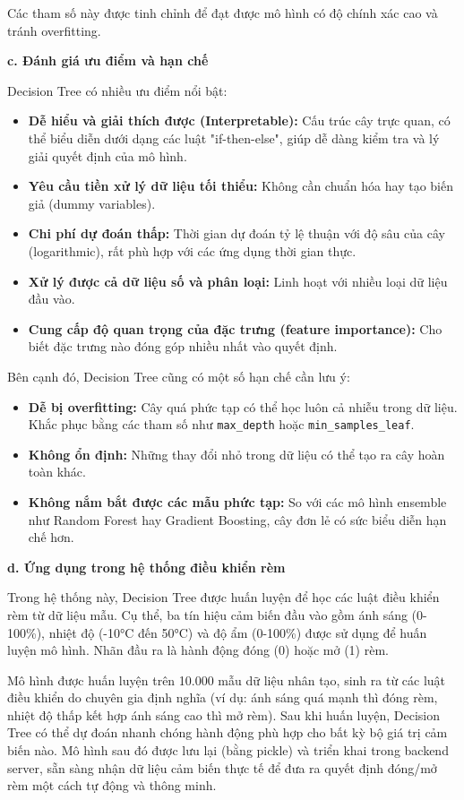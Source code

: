 Các tham số này được tinh chỉnh để đạt được mô hình có độ chính xác cao và tránh overfitting.

\textbf{c. Đánh giá ưu điểm và hạn chế}

Decision Tree có nhiều ưu điểm nổi bật:

\begin{itemize}
\item \textbf{Dễ hiểu và giải thích được (Interpretable):} Cấu trúc cây trực quan, có thể biểu diễn dưới dạng các luật "if-then-else", giúp dễ dàng kiểm tra và lý giải quyết định của mô hình.
    \item \textbf{Yêu cầu tiền xử lý dữ liệu tối thiểu:} Không cần chuẩn hóa hay tạo biến giả (dummy variables).
    \item \textbf{Chi phí dự đoán thấp:} Thời gian dự đoán tỷ lệ thuận với độ sâu của cây (logarithmic), rất phù hợp với các ứng dụng thời gian thực.
    \item \textbf{Xử lý được cả dữ liệu số và phân loại:} Linh hoạt với nhiều loại dữ liệu đầu vào.
    \item \textbf{Cung cấp độ quan trọng của đặc trưng (feature importance):} Cho biết đặc trưng nào đóng góp nhiều nhất vào quyết định.
\end{itemize}

Bên cạnh đó, Decision Tree cũng có một số hạn chế cần lưu ý:

\begin{itemize}
    \item \textbf{Dễ bị overfitting:} Cây quá phức tạp có thể học luôn cả nhiễu trong dữ liệu. Khắc phục bằng các tham số như \texttt{max\_depth} hoặc \texttt{min\_samples\_leaf}.
    \item \textbf{Không ổn định:} Những thay đổi nhỏ trong dữ liệu có thể tạo ra cây hoàn toàn khác.
    \item \textbf{Không nắm bắt được các mẫu phức tạp:} So với các mô hình ensemble như Random Forest hay Gradient Boosting, cây đơn lẻ có sức biểu diễn hạn chế hơn.
\end{itemize}

\textbf{d. Ứng dụng trong hệ thống điều khiển rèm}

Trong hệ thống này, Decision Tree được huấn luyện để học các luật điều khiển rèm từ dữ liệu mẫu. Cụ thể, ba tín hiệu cảm biến đầu vào gồm ánh sáng (0-100\%), nhiệt độ (-10°C đến 50°C) và độ ẩm (0-100\%) được sử dụng để huấn luyện mô hình. Nhãn đầu ra là hành động đóng (0) hoặc mở (1) rèm.

Mô hình được huấn luyện trên 10.000 mẫu dữ liệu nhân tạo, sinh ra từ các luật điều khiển do chuyên gia định nghĩa (ví dụ: ánh sáng quá mạnh thì đóng rèm, nhiệt độ thấp kết hợp ánh sáng cao thì mở rèm). Sau khi huấn luyện, Decision Tree có thể dự đoán nhanh chóng hành động phù hợp cho bất kỳ bộ giá trị cảm biến nào. Mô hình sau đó được lưu lại (bằng pickle) và triển khai trong backend server, sẵn sàng nhận dữ liệu cảm biến thực tế để đưa ra quyết định đóng/mở rèm một cách tự động và thông minh.
